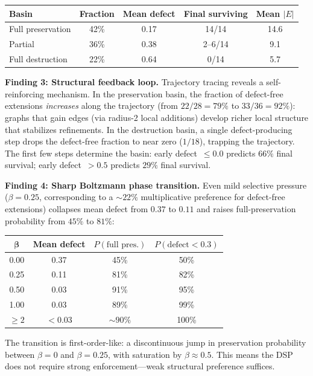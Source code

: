 \documentclass[11pt,a4paper]{article}
\theoremstyle{definition}
\theoremstyle{remark}
\begin{document}
\begin{center}
\begin{tabular}{lcccc}
\toprule
\textbf{Basin} & \textbf{Fraction} & \textbf{Mean defect} & \textbf{Final surviving} & \textbf{Mean $|E|$} \\
\midrule
Full preservation & 42\% & 0.17 & 14/14 & 14.6 \\
Partial & 36\% & 0.38 & 2--6/14 & 9.1 \\
Full destruction & 22\% & 0.64 & 0/14 & 5.7 \\
\bottomrule
\end{tabular}
\end{center}

\textbf{Finding 3: Structural feedback loop.} Trajectory tracing reveals a self-reinforcing mechanism. In the preservation basin, the fraction of defect-free extensions \emph{increases} along the trajectory (from $22/28 = 79\%$ to $33/36 = 92\%$): graphs that gain edges (via radius-2 local additions) develop richer local structure that stabilizes refinements. In the destruction basin, a single defect-producing step drops the defect-free fraction to near zero ($1/18$), trapping the trajectory. The first few steps determine the basin: early defect~$\leq 0.0$ predicts $66\%$ final survival; early defect~$> 0.5$ predicts $29\%$ final survival.

\textbf{Finding 4: Sharp Boltzmann phase transition.} Even mild selective pressure ($\beta = 0.25$, corresponding to a ${\sim}22\%$ multiplicative preference for defect-free extensions) collapses mean defect from $0.37$ to $0.11$ and raises full-preservation probability from $45\%$ to $81\%$:

\begin{center}
\begin{tabular}{cccc}
\toprule
$\boldsymbol{\beta}$ & \textbf{Mean defect} & \textbf{$P(\text{full pres.})$} & \textbf{$P(\text{defect}{<}0.3)$} \\
\midrule
0.00 & 0.37 & 45\% & 50\% \\
0.25 & 0.11 & 81\% & 82\% \\
0.50 & 0.03 & 91\% & 95\% \\
1.00 & 0.03 & 89\% & 99\% \\
$\geq 2$ & $< 0.03$ & $\sim 90\%$ & 100\% \\
\bottomrule
\end{tabular}
\end{center}

The transition is first-order-like: a discontinuous jump in preservation probability between $\beta = 0$ and $\beta = 0.25$, with saturation by $\beta \approx 0.5$. This means the DSP does not require strong enforcement---weak structural preference suffices.
\end{document}
